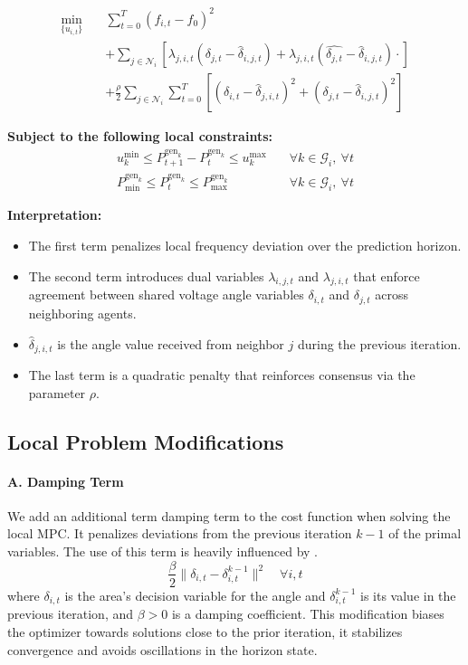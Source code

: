 \documentclass{article}
\begin{document}
\begin{align}
    \min_{\{u_{i,t}\}} \quad & \sum_{t=0}^{T} (f_{i,t} - f_0)^2 \nonumber \\
    &+ \sum_{j \in \mathcal{N}_i} \left[ \lambda_{j,i,t}(\delta_{j,t} - \hat{\delta}_{i,j,t})  + \lambda_{j,i,t}(\hat{\delta_{j,t}} - \hat{\delta}_{i, j, t}) \cdot  \right] \nonumber \\
    &+ \frac{\rho}{2} \sum_{j \in \mathcal{N}_i} \sum_{t=0}^T \left[ (\delta_{i,t} - \hat{\delta}_{j,i,t})^2 + (\delta_{j,t} - \hat{\delta}_{i,j,t})^2 \right]
\end{align}

\textbf{Subject to the following local constraints:}
\begin{align}
    u^{\min}_k \leq P^{\text{gen}_k}_{t+1} - P^{\text{gen}_k}_t \leq u^{\max}_k \quad &\forall k \in \mathcal{G}_i,\ \forall t \\
    P^{\text{gen}_k}_{\min} \leq P^{\text{gen}_k}_t \leq P^{\text{gen}_k}_{\max} \quad &\forall k \in \mathcal{G}_i,\ \forall t
\end{align}

\textbf{Interpretation:}
\begin{itemize}
    \item The first term penalizes local frequency deviation over the prediction horizon.
    \item The second term introduces dual variables $\lambda_{i,j,t}$ and $\lambda_{j,i,t}$ that enforce agreement between shared voltage angle variables $\delta_{i,t}$ and $\delta_{j,t}$ across neighboring agents.
    \item $\hat{\delta}_{j,i,t}$ is the angle value received from neighbor $j$ during the previous iteration.
    \item The last term is a quadratic penalty that reinforces consensus via the parameter $\rho$.
\end{itemize}

\subsection{Local Problem Modifications}

\paragraph{A. Damping Term} 
We add an additional term damping term to the cost function when solving the local MPC. It penalizes deviations from the previous iteration $k-1$ of the primal variables. The use of this term is heavily influenced by \cite{ADMM:edu}.
\[
 \frac{\beta}{2} \|\delta_{i,t} - \delta_{i,t}^{k-1}\|^2 \quad \forall i,t
\]
where $\delta_{i,t}$ is the area's decision variable for the angle and  $\delta_{i,t}^{k-1}$ is its value in the previous iteration, and \( \beta > 0 \) is a damping coefficient. This modification biases the optimizer towards solutions close to the prior iteration, it stabilizes convergence and avoids oscillations in the horizon state.
\end{document}
